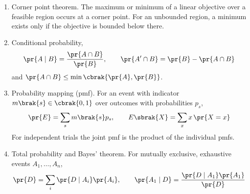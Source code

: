 \begin{enumerate}[label=\thesubsection.\arabic*, ref=\thesubsection.\theenumi]
\item Corner point theorem. The maximum or minimum of a linear objective over a feasible region occurs at a corner point. For an unbounded region, a minimum exists only if the objective is bounded below there. 
\item Conditional probability,
\begin{align}
	\pr{A\mid B} = \frac{\pr{A\cap B}}{\pr{B}}, \qquad \pr{A^{\prime}\cap B} = \pr{B} - \pr{A\cap B} \label{eq:CBSE12-cond}
\end{align}
and $\pr{A\cap B} \le \min\cbrak{\pr{A},\pr{B}}$. 
\item Probability mapping (pmf). For an event with indicator $m\brak{s}\in\cbrak{0,1}$ over outcomes with probabilities $p_s$,
\begin{align}
	\pr{E} = \sum_s m\brak{s}p_s, \qquad E\sbrak{X} = \sum_x x\,\pr{X=x} \label{eq:CBSE12-pmf}
\end{align}
For independent trials the joint pmf is the product of the individual pmfs. 
\item Total probability and Bayes' theorem. For mutually exclusive, exhaustive events $A_1, \dots, A_n$,
\begin{align}
	\pr{D} = \sum_i \pr{D\mid A_i}\pr{A_i}, \qquad
	\pr{A_1\mid D} = \frac{\pr{D\mid A_1}\pr{A_1}}{\pr{D}} \label{eq:CBSE12-bayes}
\end{align}
\end{enumerate}
